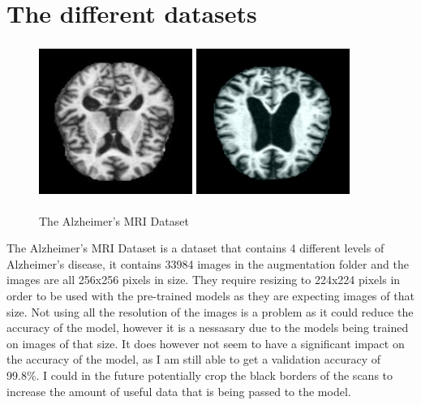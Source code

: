 \documentclass[]{final_report}
\begin{document}
\section{The different datasets}

\begin{figure}[ht!]
  \centering
  \includegraphics[width=50mm,height=50mm]{images/moderateDemented.jpg}
  \includegraphics[width=50mm,height=50mm]{images/mildDemented.jpg}
  \caption{The Alzheimer's MRI Dataset\cite{AlzheimersDataset}}
\end{figure}

The Alzheimer's MRI Dataset is a dataset that contains 4 different levels of Alzheimer's disease,
it contains 33984 images in the augmentation folder and the images are all 256x256 pixels in size.
They require resizing to 224x224 pixels in order to be used with the pre-trained models as they are expecting images of that size.
Not using all the resolution of the images is a problem as it could reduce the accuracy of the model,
however it is a nessasary due to the models being trained on images of that size.
It does however not seem to have a significant impact on the accuracy of the model, as I am still able to get a validation accuracy of 99.8\%.
I could in the future potentially crop the black borders of the scans to increase the amount of useful data that is being passed to the model.
\end{document}
